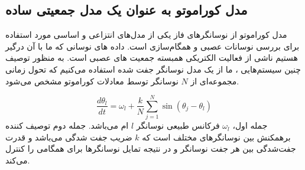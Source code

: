 

\subsection{ مدل کوراموتو به عنوان یک مدل جمعیتی ساده  }

مدل کوراموتو از نوسانگرهای فاز یکی از مدل‌های انتزاعی و اساسی مورد استفاده برای بررسی نوسانات عصبی و همگام‌سازی است.
داده های نوسانی که ما با آن درگیر هستیم ناشی از فعالیت الکتریکی همبسته جمعیت های عصبی است.
به منظور توصیف چنین سیستم‌هایی ، ما از یک مدل نوسانگر جفت شده استفاده می‌کنیم که تحول زمانی مجموعه‌ای از 
$N$
نوسانگر توسط معادلات کوراموتو مشخص می‌شود.

\begin{equation}
    \frac{d \theta_l}{dt} = \omega_l + \frac{k}{N} \sum_{j=1}^{N} \sin(\theta_j -\theta_l) 
    \label{eq:kuramotoModel}
\end{equation}
جمله اول، 
$\omega_l$
فرکانس طبیعی نوسانگر 
$l$ 
ام می‌باشد.
جمله دوم توصیف کننده برهمکنش بین نوسانگرهای مختلف است که 
$k$
ضریب جفت شدگی می‌باشد و قدرت جفت‌شدگی بین هر جفت نوسانگر و در نتیجه تمایل نوسانگرها برای همگامی را کنترل می‌کند. 

